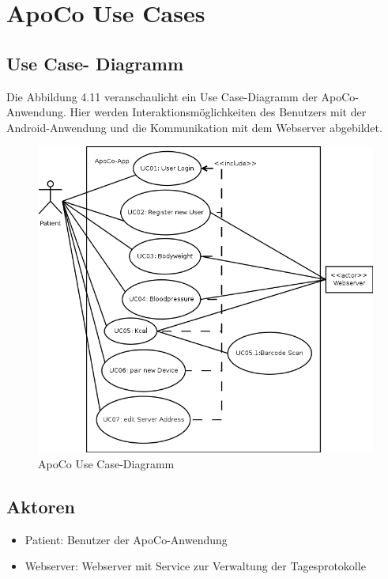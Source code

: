 

\section{ApoCo Use Cases}

\subsection{Use Case- Diagramm}

Die Abbildung 4.11 veranschaulicht ein Use Case-Diagramm der ApoCo-Anwendung.
Hier werden Interaktionsm\"oglichkeiten des Benutzers mit der Android-Anwendung und die Kommunikation 
mit dem Webserver abgebildet.
\begin{figure}[h]
  \centering
  \includegraphics[scale=0.6]{diagramme/kapitel4/use_cases.png}
  \caption{ApoCo Use Case-Diagramm}
  
\end{figure}

\subsection{Aktoren}

\begin{itemize}
 \item Patient: Benutzer der ApoCo-Anwendung
 \item Webserver: Webserver mit Service zur Verwaltung der Tagesprotokolle
\end{itemize}

